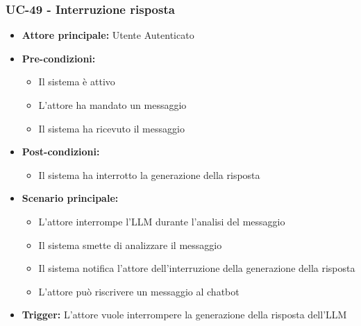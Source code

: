 \documentclass[a4paper,12pt]{article}
\begin{document}
\subsubsection{UC-49 - Interruzione risposta} \label{sec:UC-49}
\begin{itemize}
    \item \textbf{Attore principale:} Utente Autenticato
    \item \textbf{Pre-condizioni:} 
    \begin{itemize}
        \item Il sistema è attivo
	    \item L'attore ha mandato un messaggio
	    \item Il sistema ha ricevuto il messaggio
    \end{itemize}	
    \item \textbf{Post-condizioni:}
    \begin{itemize}
        \item Il sistema ha interrotto la generazione della risposta
    \end{itemize}
    \item \textbf{Scenario principale:} 
    \begin{itemize}
        \item L'attore interrompe l'LLM durante l'analisi del messaggio
        \item Il sistema smette di analizzare il messaggio
        \item Il sistema notifica l'attore dell'interruzione della generazione della risposta
        \item L'attore può riscrivere un messaggio al chatbot
    \end{itemize}
    \item \textbf{Trigger:} L'attore vuole interrompere la generazione della risposta dell'LLM
\end{itemize}
\end{document}
